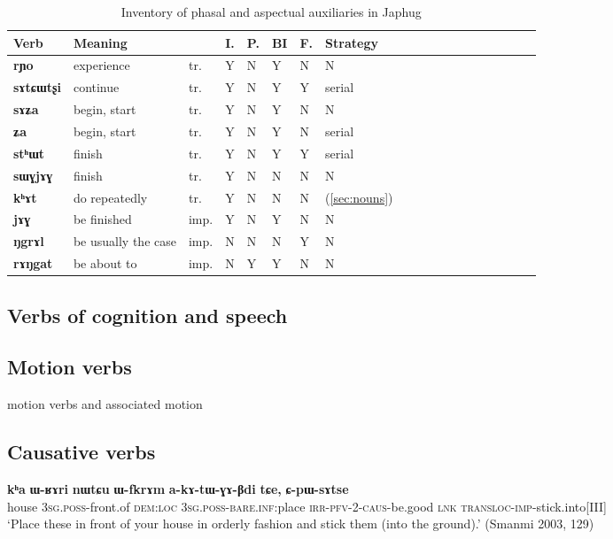 \documentclass[oneside,a4paper,11pt]{article}
\newcommand{\ipa}[1]{\textbf{\phon#1}} %
\newcommand{\refb}[1]{(\ref{#1})}
\begin{document}
\begin{table}[H]
\caption{Inventory of phasal and aspectual auxiliaries in Japhug} \label{tab:phasal} 
\begin{tabular}{lllllllllllllllllll}
\toprule
Verb & 	Meaning & 	 & 	I. & 	P.& 	BI & 	F. & 	Strategy & 	\\
\midrule
\ipa{rɲo} & 	experience & 	tr. & 	Y & 	N & 	Y & 	N & 	N & 	\\
\ipa{sɤtɕɯtʂi} & 	continue & 	tr. & 	Y & 	N & 	Y & 	Y & 	serial & 	\\
\ipa{sɤʑa} & 	begin, start & 	tr. & 	Y & 	N & 	Y & 	N & 	N & 	\\
\ipa{ʑa} & 	begin, start & 	tr. & 	Y & 	N & 	Y & 	N & 	serial & 	\\
\ipa{stʰɯt} & 	finish & 	tr. & 	Y & 	N & 	Y & 	Y & 	serial & 	\\
\ipa{sɯɣjɤɣ} & 	finish & 	tr. & 	Y & 	N & 	N & 	N & 	N & 	\\
\ipa{kʰɤt} & 	do repeatedly & 	tr. & 	Y & 	N & 	N & 	N & 	\refb{sec:nouns}& 	\\
\midrule
\ipa{jɤɣ} & 	be finished & 	imp. & 	Y & 	N & 	Y & 	N & 	N & 	\\
\ipa{ŋgrɤl} & 	be usually the case & 	imp. & 	N & 	N & 	N & 	Y & 	N & 	\\
\ipa{rɤŋgat} & 	be about to & 	imp. & 	N & 	Y & 	Y & 	N & 	N & 	\\
\bottomrule
\end{tabular}
\end{table}

   \subsection{Verbs of cognition and speech} \label{sec:cognition}
  
  \subsection{Motion verbs}
  
motion verbs and associated motion   \citet{jacques13harmonization}
  
\subsection{Causative verbs}



  \begin{exe}
\ex 
\gll \ipa{kʰa} 	\ipa{ɯ-ʁɤri} 	\ipa{nɯtɕu} 	\ipa{ɯ-fkrɤm} 	\ipa{a-kɤ-tɯ-ɣɤ-βdi} 	\ipa{tɕe,} 	\ipa{ɕ-pɯ-sɤtse} \\
house \textsc{3sg.poss}-front.of \textsc{dem:loc} \textsc{3sg.poss-bare.inf}:place \textsc{irr-pfv-2-caus}-be.good \textsc{lnk} \textsc{transloc-imp}-stick.into[III] \\
\glt `Place these in front of your house in orderly fashion and stick them (into the ground).' (Smanmi 2003, 129)
  \end{exe}
  
\end{document}
